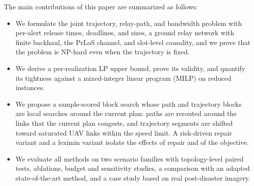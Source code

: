The main contributions of this paper are summarized as follows:
\begin{itemize}
\item We formulate the joint trajectory, relay-path, and bandwidth problem with per-alert release times, deadlines, and sizes, a ground relay network with finite backhaul, the PrLoS channel, and slot-level causality, and we prove that the problem is NP-hard even when the trajectory is fixed.
\item We derive a per-realization LP upper bound, prove its validity, and quantify its tightness against a mixed-integer linear program (MILP) on reduced instances.
\item We propose a sample-scored block search whose path and trajectory blocks are local searches around the current plan: paths are rerouted around the links that the current plan congests, and trajectory segments are shifted toward saturated UAV links within the speed limit. A risk-driven repair variant and a leximin variant isolate the effects of repair and of the objective.
\item We evaluate all methods on two scenario families with topology-level paired tests, ablations, budget and sensitivity studies, a comparison with an adapted state-of-the-art method, and a case study based on real post-disaster imagery.
\end{itemize}
